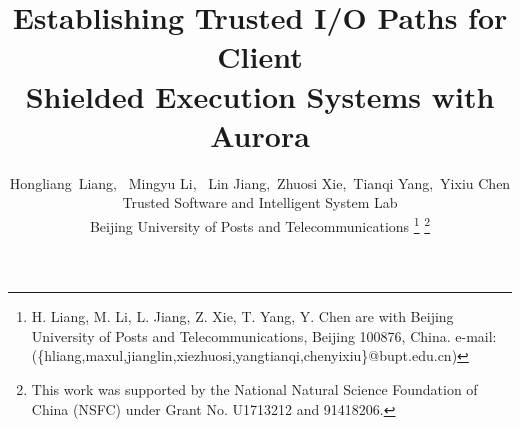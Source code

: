 \documentclass[journal,twocolumn,letterpaper,10pt]{ieee-sty/IEEEtran}
\begin{document}


\title{ Establishing Trusted I/O Paths for Client \\ Shielded Execution Systems with Aurora }

\author{Hongliang~Liang,~
	Mingyu Li,%
	~Lin Jiang,~Zhuosi Xie,~Tianqi Yang,~Yixiu Chen\\
	Trusted Software and Intelligent System Lab\\
	Beijing University of Posts and Telecommunications
	\thanks{H. Liang, M. Li, L. Jiang, Z. Xie, T. Yang, Y. Chen 
  are with Beijing University of Posts and Telecommunications, Beijing 100876, China. e-mail: (\{hliang,maxul,jianglin,xiezhuosi,yangtianqi,chenyixiu\}@bupt.edu.cn)
  }%
	\thanks{This work was supported by the National Natural Science Foundation of China (NSFC) under Grant No. U1713212 and 91418206.}
}

\maketitle









\end{document}
